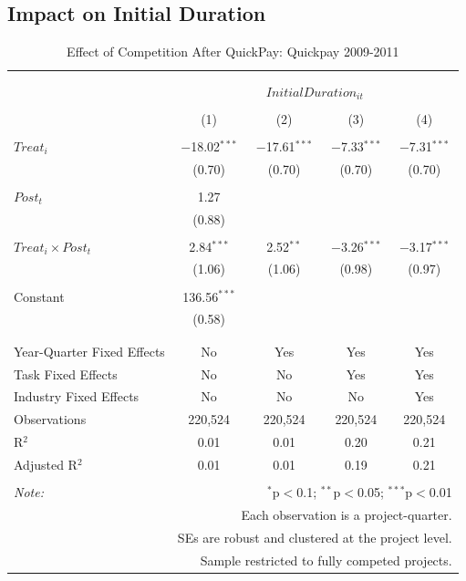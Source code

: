 \documentclass[
]{article}
\begin{document}
\hypertarget{impact-on-initial-duration}{%
\subsection{Impact on Initial
Duration}\label{impact-on-initial-duration}}

\begin{table}[H] \centering 
  \caption{Effect of Competition After QuickPay: Quickpay 2009-2011} 
  \label{} 
\small 
\begin{tabular}{@{\extracolsep{-2pt}}lcccc} 
\\[-1.8ex]\hline 
\hline \\[-1.8ex] 
\\[-1.8ex] & \multicolumn{4}{c}{$InitialDuration_{it}$} \\ 
\\[-1.8ex] & (1) & (2) & (3) & (4)\\ 
\hline \\[-1.8ex] 
 $Treat_i$ & $-$18.02$^{***}$ & $-$17.61$^{***}$ & $-$7.33$^{***}$ & $-$7.31$^{***}$ \\ 
  & (0.70) & (0.70) & (0.70) & (0.70) \\ 
  & & & & \\ 
 $Post_t$ & 1.27 &  &  &  \\ 
  & (0.88) &  &  &  \\ 
  & & & & \\ 
 $Treat_i \times Post_t$ & 2.84$^{***}$ & 2.52$^{**}$ & $-$3.26$^{***}$ & $-$3.17$^{***}$ \\ 
  & (1.06) & (1.06) & (0.98) & (0.97) \\ 
  & & & & \\ 
 Constant & 136.56$^{***}$ &  &  &  \\ 
  & (0.58) &  &  &  \\ 
  & & & & \\ 
\hline \\[-1.8ex] 
Year-Quarter Fixed Effects & No & Yes & Yes & Yes \\ 
Task Fixed Effects & No & No & Yes & Yes \\ 
Industry Fixed Effects & No & No & No & Yes \\ 
Observations & 220,524 & 220,524 & 220,524 & 220,524 \\ 
R$^{2}$ & 0.01 & 0.01 & 0.20 & 0.21 \\ 
Adjusted R$^{2}$ & 0.01 & 0.01 & 0.19 & 0.21 \\ 
\hline 
\hline \\[-1.8ex] 
\textit{Note:}  & \multicolumn{4}{r}{$^{*}$p$<$0.1; $^{**}$p$<$0.05; $^{***}$p$<$0.01} \\ 
 & \multicolumn{4}{r}{Each observation is a project-quarter.} \\ 
 & \multicolumn{4}{r}{SEs are robust and clustered at the project level.} \\ 
 & \multicolumn{4}{r}{Sample restricted to fully competed projects.} \\ 
\end{tabular} 
\end{table}
\end{document}
